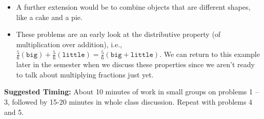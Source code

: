 \documentclass{ximera}
\begin{document}
\begin{instructorNotes}
\begin{itemize}
	\item A further extension would be to combine objects that are different shapes, like a cake and a pie.
	\item These problems are an early look at the distributive property (of multiplication over addition), i.e., $\frac56(\texttt{big}) + \frac56(\texttt{little}) = \frac56(\texttt{big} + \texttt{little})$.  We can return to this example later in the semester when we discuss these properties since we aren't ready to talk about multiplying fractions just yet.
	
 
\end{itemize}

{\bf Suggested Timing:} 
About 10 minutes of work in small groups on problems 1 -- 3, followed by 15-20 minutes in whole class discussion. Repeat with problems 4 and 5.
\end{instructorNotes}
\end{document}
